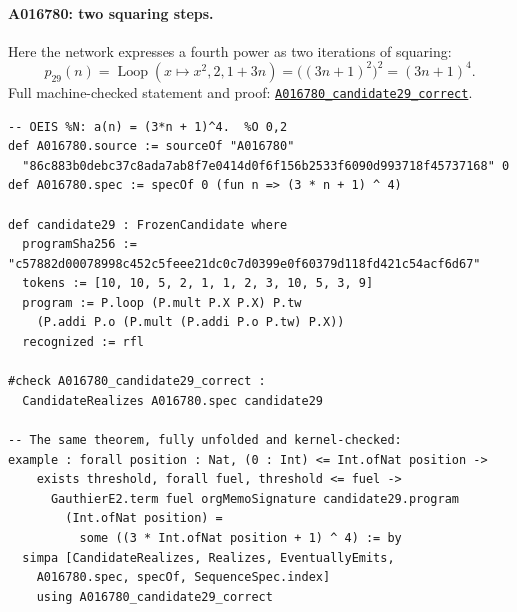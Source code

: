 \documentclass[11pt]{article}
\newcommand{\formalcommit}{f3a31db36bb2f944312ee31c1d86c2758109e83a}
\newcommand{\formalblob}{https://github.com/zariuq/MeTTapedia/blob/\formalcommit/lean/mettapedia/Mettapedia}
\newcommand{\leansource}[3]{%
  \href{\formalblob/#1\#L#2}{\nolinkurl{#3}}}
\begin{document}
\paragraph{A016780: two squaring steps.}
Here the network expresses a fourth power as two iterations of squaring:
\[
 p_{29}(n)=\operatorname{Loop}(x\mapsto x^2,2,1+3n)
          =\bigl((3n+1)^2\bigr)^2=(3n+1)^4.
\]
\noindent Full machine-checked statement and proof:
\leansource{GSLT/LanguageDef/Gauthier/Adjudications33.lean}{265-L280}{A016780_candidate29_correct}.
\begin{lstlisting}[caption={A016780, discovered exclusively by the belief-register arm
through derived retention in world 1, generation 4. The OEIS entry contains 31 published
terms; the theorem is universal.}]
-- OEIS %N: a(n) = (3*n + 1)^4.  %O 0,2
def A016780.source := sourceOf "A016780"
  "86c883b0debc37c8ada7ab8f7e0414d0f6f156b2533f6090d993718f45737168" 0
def A016780.spec := specOf 0 (fun n => (3 * n + 1) ^ 4)

def candidate29 : FrozenCandidate where
  programSha256 := "c57882d00078998c452c5feee21dc0c7d0399e0f60379d118fd421c54acf6d67"
  tokens := [10, 10, 5, 2, 1, 1, 2, 3, 10, 5, 3, 9]
  program := P.loop (P.mult P.X P.X) P.tw
    (P.addi P.o (P.mult (P.addi P.o P.tw) P.X))
  recognized := rfl

#check A016780_candidate29_correct :
  CandidateRealizes A016780.spec candidate29

-- The same theorem, fully unfolded and kernel-checked:
example : forall position : Nat, (0 : Int) <= Int.ofNat position ->
    exists threshold, forall fuel, threshold <= fuel ->
      GauthierE2.term fuel orgMemoSignature candidate29.program
        (Int.ofNat position) =
          some ((3 * Int.ofNat position + 1) ^ 4) := by
  simpa [CandidateRealizes, Realizes, EventuallyEmits,
    A016780.spec, specOf, SequenceSpec.index]
    using A016780_candidate29_correct
\end{lstlisting}

\end{document}
